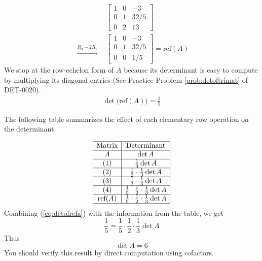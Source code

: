 \documentclass{ximera}
\begin{document}
\begin{example}
\begin{explanation}
\begin{align}
\begin{array}{c}
 \\
\end{array}
&\left[\begin{array}{ccc}  
 1&0&-3\\0&1&32/5\\0&2&13
 \end{array}\right]\label{eq:refstep4}\\
  \begin{array}{c}
  \\
\\
\xrightarrow{R_3-2R_2}\\
\end{array}&\left[\begin{array}{ccc}  
 1&0&-3\\0&1&32/5\\0&0&1/5
 \end{array}\right]=\mbox{ref}(A)\nonumber
\end{align}
We stop at the row-echelon form of $A$ because its determinant is easy to compute by multiplying its diagonal entries (See Practice Problem \ref{prob:detoftrimat} of DET-0020).
\begin{align}\label{eq:detofrefa}\det{\big(\mbox{ref}(A)\big)}=\frac{1}{5}\end{align}

The following table summarizes the effect of each elementary row operation on the determinant.

$$\begin{array}{|c|c|}  
 \hline \text{Matrix}&\text{Determinant}\\ \hline A&  \det{A}\\ \hline (1) & \frac{1}{3}\det{A}\\
 \hline (2) &\frac{1}{2}\cdot\frac{1}{3}\det{A}\\
 \hline (3) &\frac{1}{2}\cdot\frac{1}{3}\det{A}\\
 \hline (4)&\frac{1}{5}\cdot\frac{1}{2}\cdot\frac{1}{3}\det{A}\\
 \hline \mbox{ref}(A)& \frac{1}{5}\cdot\frac{1}{2}\cdot\frac{1}{3}\det{A} \\ \hline
 \end{array}$$
 Combining (\ref{eq:detofrefa}) with the information from the table, we get
 $$\frac{1}{5}=\frac{1}{5}\cdot\frac{1}{2}\cdot\frac{1}{3}\det{A}$$
 Thus
 $$\det{A}=6$$
 You should verify this result by direct computation using cofactors.
\end{explanation}
\end{example}
\end{document}
